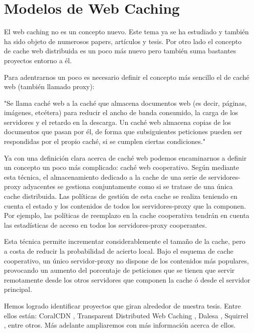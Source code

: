 
\chapter{Modelos de Web Caching} %

\label{ch:modelos_web_caching} %

El web caching no es un concepto nuevo. Este tema ya se ha estudiado y también ha sido objeto de numerosos papers, artículos y tesis. Por otro lado el concepto de cache web distribuida es un poco más nuevo pero también suma bastantes proyectos entorno a él.

Para adentrarnos un poco es necesario definir el concepto más sencillo el de caché web (también llamado proxy):

"Se llama caché web a la caché que almacena documentos web (es decir, páginas, imágenes, etcétera) para reducir el ancho de banda consumido, la carga de los servidores y el retardo en la descarga. Un caché web almacena copias de los documentos que pasan por él, de forma que subsiguientes peticiones pueden ser respondidas por el propio caché, si se cumplen ciertas condiciones." \cite{wiki_cacheweb}

Ya con una definición clara acerca de caché web podemos encaminarnos a definir un concepto un poco más complicado: caché web cooperativo.
Según \cite{rowstron:2001} mediante esta técnica, el almacenamiento dedicado a la cache de una serie de servidores-proxy adyacentes se gestiona conjuntamente como si se tratase de una única cache distribuida. Las políticas de gestión de esta cache se realiza teniendo en cuenta el estado y los contenidos de todos los servidores-proxy que la componen. Por ejemplo, las políticas de reemplazo en la cache cooperativa tendrán en cuenta las estadísticas de acceso en todos los servidores-proxy cooperantes.

Esta técnica permite incrementar considerablemente el tamaño de la cache, pero a costa de
reducir la probabilidad de acierto local. Bajo el esquema de cache cooperativo, un único  servidor-proxy no dispone de los contenidos más populares, provocando un aumento del porcentaje de peticiones que se tienen que servir remotamente desde los otros servidores que componen la cache ó desde el servidor principal.

Hemos logrado identificar proyectos que giran alrededor de nuestra tesis. Entre ellos están:
CoralCDN \cite{freedman:2004}, Transparent Distributed Web Caching \cite{liang:2001}, Dalesa \cite{wathsala:2009}, Squirrel \cite{rowstron:2001}, entre otros. Más adelante ampliaremos con más información acerca de ellos.


